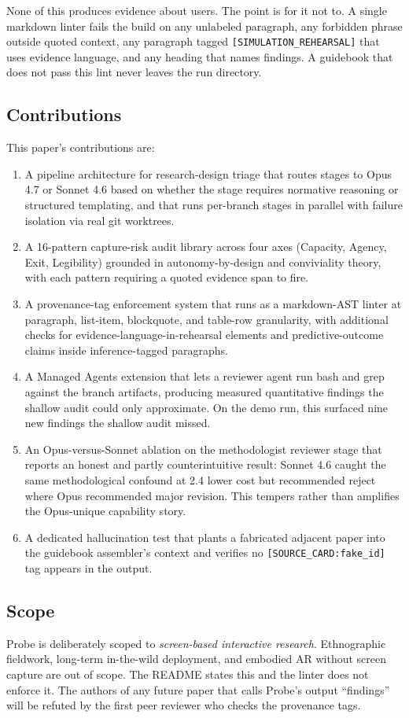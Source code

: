 None of this produces evidence about users. The point is for it not to. A single markdown linter fails the build on any unlabeled paragraph, any forbidden phrase outside quoted context, any paragraph tagged \texttt{[SIMULATION\_REHEARSAL]} that uses evidence language, and any heading that names findings. A guidebook that does not pass this lint never leaves the run directory.

\subsection{Contributions}

This paper's contributions are:

\begin{enumerate}
    \item A pipeline architecture for research-design triage that routes stages to Opus 4.7 or Sonnet 4.6 based on whether the stage requires normative reasoning or structured templating, and that runs per-branch stages in parallel with failure isolation via real git worktrees.
    \item A 16-pattern capture-risk audit library across four axes (Capacity, Agency, Exit, Legibility) grounded in autonomy-by-design and conviviality theory, with each pattern requiring a quoted evidence span to fire.
    \item A provenance-tag enforcement system that runs as a markdown-AST linter at paragraph, list-item, blockquote, and table-row granularity, with additional checks for evidence-language-in-rehearsal elements and predictive-outcome claims inside inference-tagged paragraphs.
    \item A Managed Agents extension that lets a reviewer agent run bash and grep against the branch artifacts, producing measured quantitative findings the shallow audit could only approximate. On the demo run, this surfaced nine new findings the shallow audit missed.
    \item An Opus-versus-Sonnet ablation on the methodologist reviewer stage that reports an honest and partly counterintuitive result: Sonnet 4.6 caught the same methodological confound at 2.4\texttimes{} lower cost but recommended reject where Opus recommended major revision. This tempers rather than amplifies the Opus-unique capability story.
    \item A dedicated hallucination test that plants a fabricated adjacent paper into the guidebook assembler's context and verifies no \texttt{[SOURCE\_CARD:fake\_id]} tag appears in the output.
\end{enumerate}

\subsection{Scope}

Probe is deliberately scoped to \emph{screen-based interactive research}. Ethnographic fieldwork, long-term in-the-wild deployment, and embodied AR without screen capture are out of scope. The README states this and the linter does not enforce it. The authors of any future paper that calls Probe's output ``findings'' will be refuted by the first peer reviewer who checks the provenance tags.
